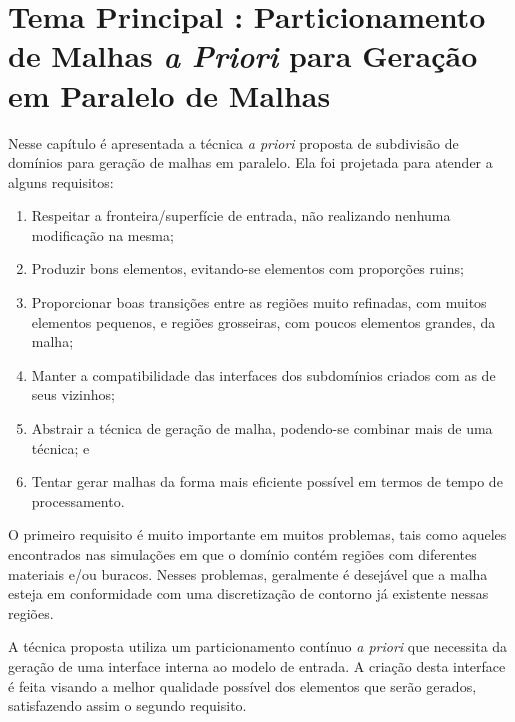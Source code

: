 \chapter{Tema Principal : Particionamento de Malhas \textit{a Priori} para Geração em Paralelo de Malhas}\label{tema1}

Nesse capítulo é apresentada a técnica \textit{a priori} proposta de subdivisão de domínios para geração de malhas em paralelo. Ela foi projetada para atender a alguns requisitos:

\begin{enumerate}
	\item Respeitar a fronteira/superfície de entrada, não realizando nenhuma modificação na mesma;
	
	\item Produzir bons elementos, evitando-se elementos com proporções ruins;
	
	\item Proporcionar boas transições entre as regiões muito refinadas, com muitos elementos pequenos, e regiões grosseiras, com poucos elementos grandes, da malha;
	
	\item Manter a compatibilidade das interfaces dos subdomínios criados com as de seus vizinhos;
	
	\item Abstrair a técnica de geração de malha, podendo-se combinar mais de uma técnica; e
	
	
	\item Tentar gerar malhas da forma mais eficiente possível em termos de tempo de processamento.
\end{enumerate}


O primeiro requisito é muito importante em muitos problemas, tais como aqueles encontrados nas simulações em que o domínio contém regiões com diferentes materiais e/ou buracos. Nesses problemas, geralmente é desejável que a malha esteja em conformidade com uma discretização de contorno já existente nessas regiões.

A técnica proposta utiliza um particionamento contínuo \textit{a priori} que necessita da geração de uma interface interna ao modelo de entrada. A criação desta interface é feita visando a melhor qualidade possível dos elementos que serão gerados, satisfazendo assim o segundo requisito.

